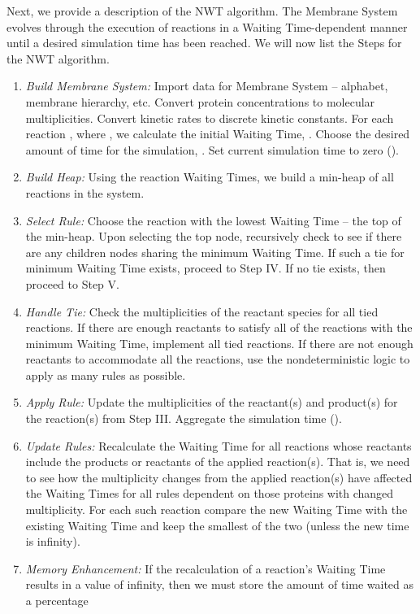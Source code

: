 \documentclass[copyright]{eptcs}
\newcommand{\wtri}{}
\begin{document}
Next, we provide a description of the NWT algorithm.  The Membrane System evolves through the execution of reactions in a Waiting Time-dependent manner until a desired simulation time has been reached.  We will now list the Steps for the NWT algorithm.

\begin{enumerate}[{\sc(i)}]
\item  {\it Build Membrane System:} Import data for Membrane System -- alphabet, membrane 
hierarchy, etc.  Convert protein concentrations to molecular multiplicities.  Convert 
kinetic rates to discrete kinetic constants.  For each reaction , where 
, we calculate the initial Waiting Time, \wtri  .  
Choose the desired amount of time for the simulation, .  Set current simulation
time to zero ().
\item {\it Build Heap:}  Using the reaction Waiting Times, we build a min-heap of all 
reactions in the system.
\item  {\it Select Rule:} Choose the reaction with the lowest Waiting Time -- the top of the 
min-heap.  Upon selecting the top node, recursively check to see if there are any children 
nodes sharing the minimum Waiting Time.  If such a tie for minimum Waiting Time exists, 
proceed to Step IV.  If no tie exists, then proceed to Step V.
\item  {\it Handle Tie:} Check the multiplicities of the reactant species for all tied 
reactions.  If there are enough reactants to satisfy all of the reactions with the minimum 
Waiting Time, implement all tied reactions.  If there are not enough reactants to accommodate 
all the reactions, use the nondeterministic logic to apply as many rules as possible.
\item  {\it Apply Rule:} Update the multiplicities of the reactant(s) and product(s) for the 
reaction(s) from Step III.
Aggregate the simulation time (\hbox{}).
\item  {\it Update Rules:} Recalculate the Waiting Time for all reactions whose reactants 
include the products or reactants of the applied reaction(s).  That is, we need to see how 
the multiplicity changes from the applied reaction(s) have affected the Waiting Times for 
all rules dependent on those proteins with changed multiplicity.  For each such reaction 
compare the new Waiting Time with the existing Waiting Time and keep the smallest of the
two (unless the new time is infinity).
\item {\it Memory Enhancement:} If the recalculation of a reaction's Waiting Time results 
in a value of infinity, then we must store the amount of time waited as a percentage 

\end{enumerate}
\end{document}
